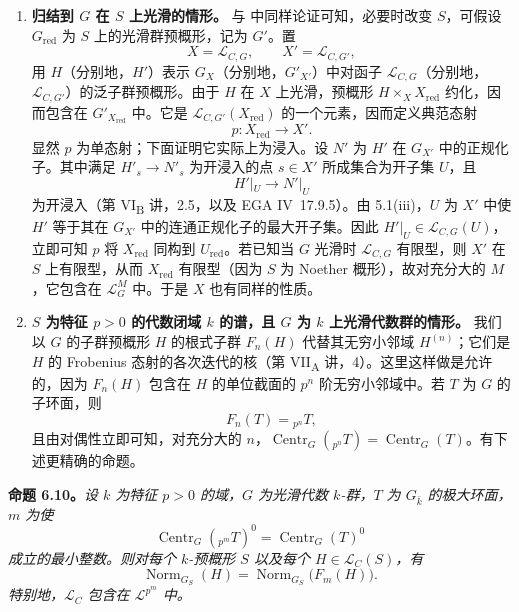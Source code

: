 \begin{enumerate}
\renewcommand{\labelenumi}{\alph{enumi})}
\item \textbf{归结到 \(G\) 在 \(S\) 上光滑的情形。}
与  中同样论证可知，必要时改变 \(S\)，可假设 \(G_{\mathrm{red}}\) 为 \(S\) 上的光滑群预概形，记为 \(G'\)。置
\[
X=\mathcal L_{C,G},\qquad X'=\mathcal L_{C,G'},
\]
用 \(H\)（分别地，\(H'\)）表示 \(G_X\)（分别地，\(G'_{X'}\)）中对函子 \(\mathcal L_{C,G}\)（分别地，\(\mathcal L_{C,G'}\)）的泛子群预概形。由于 \(H\) 在 \(X\) 上光滑，预概形 \(H\times_X X_{\mathrm{red}}\) 约化，因而包含在 \(G'_{X_{\mathrm{red}}}\) 中。它是 \(\mathcal L_{C,G'}(X_{\mathrm{red}})\) 的一个元素，因而定义典范态射
\[
p:X_{\mathrm{red}}\longrightarrow X'.
\]
显然 \(p\) 为单态射；下面证明它实际上为浸入。设 \(N'\) 为 \(H'\) 在 \(G_{X'}\) 中的正规化子。其中满足 \(H'_s\to N'_s\) 为开浸入的点 \(s\in X'\) 所成集合为开子集 \(U\)，且
\[
H'|_U\longrightarrow N'|_U
\]
为开浸入（第 VI\textsubscript{B} 讲，2.5，以及 EGA IV~17.9.5）。由 5.1(iii)，\(U\) 为 \(X'\) 中使 \(H'\) 等于其在 \(G_{X'}\) 中的连通正规化子的最大开子集。因此 \(H'|_U\in\mathcal L_{C,G}(U)\)，立即可知 \(p\) 将 \(X_{\mathrm{red}}\) 同构到 \(U_{\mathrm{red}}\)。若已知当 \(G\) 光滑时 \(\mathcal L_{C,G}\) 有限型，则 \(X'\) 在 \(S\) 上有限型，从而 \(X_{\mathrm{red}}\) 有限型（因为 \(S\) 为 Noether 概形），故对充分大的 \(M\)，它包含在 \(\mathcal L_G^M\) 中。于是 \(X\) 也有同样的性质。

\item \textbf{\(S\) 为特征 \(p>0\) 的代数闭域 \(k\) 的谱，且 \(G\) 为 \(k\) 上光滑代数群的情形。}
我们以 \(G\) 的子群预概形 \(H\) 的根式子群 \(F_n(H)\) 代替其无穷小邻域 \(H^{(n)}\)；它们是 \(H\) 的 Frobenius 态射的各次迭代的核（第 VII\textsubscript{A} 讲，4）。这里这样做是允许的，因为 \(F_n(H)\) 包含在 \(H\) 的单位截面的 \(p^n\) 阶无穷小邻域中。若 \(T\) 为 \(G\) 的子环面，则
\[
F_n(T)={}_{p^n}T,
\]
且由对偶性立即可知，对充分大的 \(n\)，\(\operatorname{Centr}_G({}_{p^n}T)=\operatorname{Centr}_G(T)\)。有下述更精确的命题。
\end{enumerate}

\textbf{命题 6.10。}\emph{设 \(k\) 为特征 \(p>0\) 的域，\(G\) 为光滑代数 \(k\)-群，\(T\) 为 \(G_{\bar k}\) 的极大环面，\(m\) 为使
\[
\operatorname{Centr}_G({}_{p^m}T)^0
 =\operatorname{Centr}_G(T)^0
\]
成立的最小整数。则对每个 \(k\)-预概形 \(S\) 以及每个 \(H\in\mathcal L_C(S)\)，有
\[
\operatorname{Norm}_{G_S}(H)
 =\operatorname{Norm}_{G_S}\bigl(F_m(H)\bigr).
\]
特别地，\(\mathcal L_C\) 包含在 \(\mathcal L^{p^m}\) 中。}

